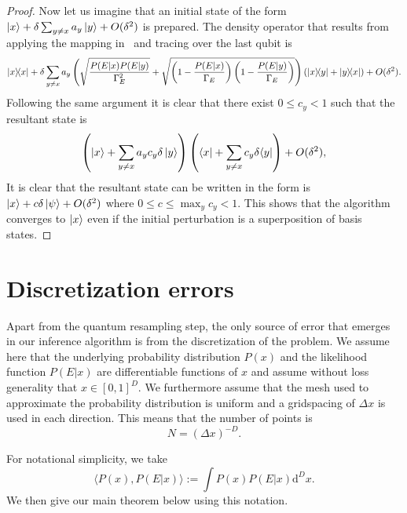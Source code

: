 \documentclass[aps,amsmath,onecolumn,amssymb]{revtex4}
\begin{document}
\begin{proof}
Now let us imagine that an initial state of the form $\left|x\right\rangle + \delta \sum_{y\ne x} a_y \left|y\right\rangle + O(\delta^2)$ is prepared.  The density operator that results from applying the mapping in~ and tracing over the last qubit is
\begin{equation}
|x\rangle\!\langle x| + \delta\sum_{y\ne x}a_y\left(\sqrt{\frac{P(E|x)P(E|y)}{\Gamma_E^2}} + \sqrt{\left(1-\frac{P(E|x)}{\Gamma_E}\right)\left(1-\frac{P(E|y)}{\Gamma_E}\right)} \right)(|x\rangle\!\langle y|+|y\rangle\!\langle x|) + O(\delta^2).
\end{equation}
Following the same argument it is clear that there exist $0\le c_y<1$ such that the resultant state is
\begin{equation}
\left(\left|x\right\rangle + \sum_{y\ne x}a_y c_y\delta \left|y\right\rangle\right)\left(\langle x| + \sum_{y\ne x}c_y\delta \langle y|\right) + O(\delta^2),
\end{equation}
It is clear that the resultant state can be written in the form is $\left|x\right\rangle + c\delta \left|\psi\right\rangle + O(\delta^2)$ where $0\le c\le \max_y c_y < 1$.  This shows that the algorithm converges to $\left|x\right\rangle$ even if the initial perturbation is a superposition of basis states.
\end{proof}


\section{Discretization errors}
Apart from the quantum resampling step, the only source of error that emerges in our inference algorithm is from the discretization of the problem.  We assume here that the underlying probability distribution $P(x)$ and the likelihood function $P(E|x)$ are differentiable functions of $x$ and assume without loss generality that $x\in [0,1]^D$.  We furthermore assume that the mesh used to approximate the probability distribution is uniform and a gridspacing of $\Delta x$ is used in each direction.  This means that the number of points is 
\begin{equation}
N= (\Delta x)^{-D}.
\end{equation}

For notational simplicity,  we take
\begin{equation}
\langle P(x), P(E|x) \rangle := \int P(x) P(E|x) \mathrm{d}^D x.
\end{equation}
We then give our main theorem below using this notation.
\end{document}
